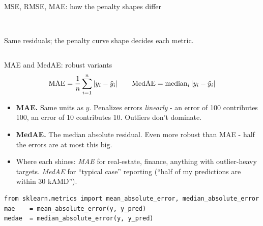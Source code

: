 \documentclass[aspectratio=169]{beamer}
\begin{document}
\begin{frame}[fragile]{MSE, RMSE, MAE: how the penalty shapes differ}
\begin{columns}[T]
\begin{center}
\\
      \scriptsize Same residuals; the penalty curve shape decides each metric.
    \end{center}
  \end{columns}
\end{frame}

\begin{frame}[fragile]{MAE and MedAE: robust variants}
  \[
    \text{MAE} = \frac{1}{n} \sum_{i=1}^n |y_i - \hat{y}_i|
    \qquad
    \text{MedAE} = \text{median}_i\, |y_i - \hat{y}_i|
  \]
  \vfill
  \begin{itemize}
    \item \textbf{MAE.} Same units as $y$. Penalizes errors \emph{linearly} - an error of 100 contributes 100, an error of 10 contributes 10. Outliers don't dominate.
    \item \textbf{MedAE.} The median absolute residual. Even more robust than MAE - half the errors are at most this big.
    \item Where each shines: \emph{MAE} for real-estate, finance, anything with outlier-heavy targets. \emph{MedAE} for ``typical case'' reporting (``half of my predictions are within 30 kAMD'').
  \end{itemize}
  \vfill
{\lstset{basicstyle=\ttfamily\scriptsize}
\begin{lstlisting}
from sklearn.metrics import mean_absolute_error, median_absolute_error
mae    = mean_absolute_error(y, y_pred)
medae  = median_absolute_error(y, y_pred)
\end{lstlisting}}
\end{frame}
\end{document}
